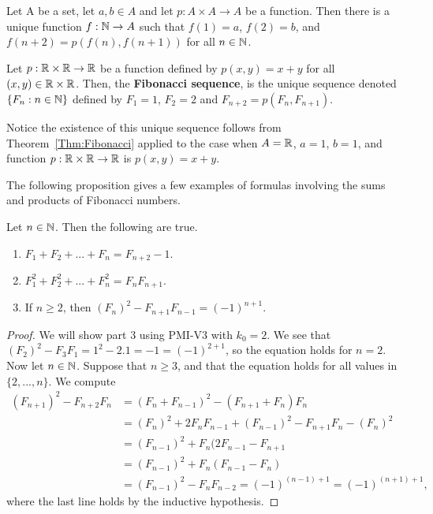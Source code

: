 \documentclass[a4paper,english,12pt]{article}
\begin{document}
\begin{thm}\label{Thm:Fibonacci} Let A be a set, let $a, b \in A$ and let $p : A \times A \to A$ be a function. Then there is a unique function $f : \mathbb{N} \to A$ such that $f(1) = a$, $f(2) = b$, and $f(n + 2) = p(f(n), f(n + 1))$ for all $n \in \mathbb{N}$. 
\end{thm}
\begin{defn} Let $p : \mathbb{R} \times \mathbb{R} \to \mathbb{R}$ be a function defined by $p(x,y)=x+y$ for all $(x,y)\in \mathbb{R} \times \mathbb{R}$. Then, the \textbf{Fibonacci sequence}, is the unique sequence denoted $\{F_n : n \in \mathbb{N} \}$ defined by $F_1 = 1$, $F_2 = 2$ and $F_{n+2} = p(F_n, F_{n+1})$.
\end{defn}
\begin{rem} Notice the existence of this unique sequence follows from Theorem~\ref{Thm:Fibonacci} applied to the case when $A = \mathbb{R}$, $a = 1$, $b = 1$, and function $p : \mathbb{R} \times \mathbb{R} \to \mathbb{R}$ is $p(x,y) = x+y$.
\end{rem}
The following proposition gives a few examples of formulas involving the sums and products of Fibonacci numbers.
\begin{prop} Let $n\in \mathbb{N}$. Then the following are true.
\begin{enumerate}
\item $F_1 + F_2 + . . . + F_n = F_{n+2} - 1$.
\item $F_1^2 + F_2^2 + . . . + F_n^2 = F_nF_{n+1}$.
\item If $n \geq 2$, then $(F_n)^2 - F_{n+1}F_{n-1}=(-1)^{n+1}$.
\end{enumerate}
\end{prop}
\begin{proof} We will show part 3 using PMI-V3 with $k_0=2$. We see that $(F_2)^2-F_3F_1=1^2-2.1=-1=(-1)^{2+1}$, so the equation holds for $n=2$. Now let $n\in \mathbb{N}$. Suppose that $n \geq 3$, and that the equation holds for all values in $\{2, . . ., n\}$. We compute 
\begin{align*}
(F_{n+1})^2 - F_{n+2}F_n&=(F_n+F_{n-1})^2 - (F_{n+1}+F_n)F_n\\
&=(F_n)^2+2F_nF_{n-1}+(F_{n-1})^2-F_{n+1}F_n-(F_n)^2\\
&=(F_{n-1})^2+F_n(2F_{n-1}-F_{n+1}\\
&=(F_{n-1})^2+F_n(F_{n-1}-F_n)\\
&=(F_{n-1})^2-F_nF_{n-2}=(-1)^{(n-1)+1}=(-1)^{(n+1)+1},
\end{align*} 
where the last line holds by the inductive hypothesis.
\end{proof}
\end{document}

